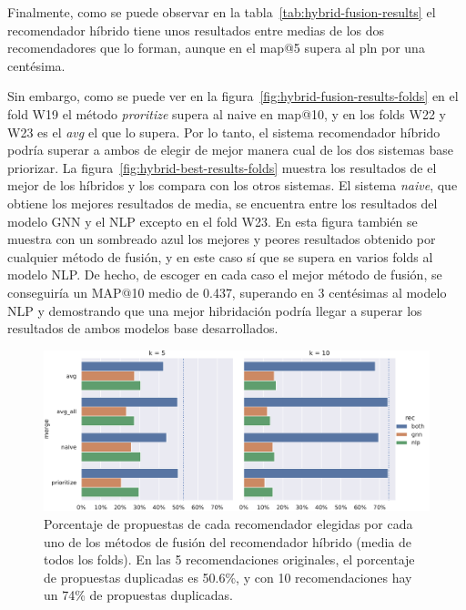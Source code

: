 Finalmente, como se puede observar en la tabla~\ref{tab:hybrid-fusion-results} el recomendador híbrido tiene unos resultados entre medias de los dos recomendadores que lo forman, aunque en el map@5 supera al pln por una centésima.

Sin embargo, como se puede ver en la figura~\ref{fig:hybrid-fusion-results-folds} en el fold W19 el método \textit{proritize} supera al naive en map@10, y en los folds W22 y W23 es el \textit{avg} el que lo supera. Por lo tanto, el sistema recomendador híbrido podría superar a ambos de elegir de mejor manera cual de los dos sistemas base priorizar. La figura~\ref{fig:hybrid-best-results-folds} muestra los resultados de el mejor de los híbridos y los compara con los otros sistemas. El sistema \textit{naive}, que obtiene los mejores resultados de media, se encuentra entre los resultados del modelo GNN y el NLP excepto en el fold W23. En esta figura también se muestra con un sombreado azul los mejores y peores resultados obtenido por cualquier método de fusión, y en este caso sí que se supera en varios folds al modelo NLP. De hecho, de escoger en cada caso el mejor método de fusión, se conseguiría un MAP@10 medio de 0.437, superando en 3 centésimas al modelo NLP y demostrando que una mejor hibridación podría llegar a superar los resultados de ambos modelos base desarrollados.

\begin{figure}
    \centering
    \includegraphics[width=\linewidth]{figures/04_implementacion/12_hybrid_merge_usage_Decentraland_W-THU_normalize=True.pdf}
    \caption[Porcentaje de propuestas de cada recomendador elegidas por cada uno de los métodos de fusión del recomendador híbrido.]{Porcentaje de propuestas de cada recomendador elegidas por cada uno de los métodos de fusión del recomendador híbrido (media de todos los folds). En las 5 recomendaciones originales, el porcentaje de propuestas duplicadas es 50.6\%, y con 10 recomendaciones hay un 74\% de propuestas duplicadas.}
    \label{fig:hybrid-fusion-results}
\end{figure}


